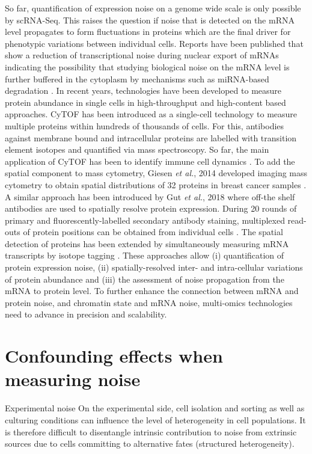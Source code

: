 So far, quantification of expression noise on a genome wide scale is only possible by scRNA-Seq. This raises the question if noise that is detected on the mRNA level propagates to form fluctuations in proteins which are the final driver for phenotypic variations between individual cells. Reports have been published that show a reduction of transcriptional noise during nuclear export of mRNAs \citep{Battich2015a, BaharHalpern2015a} indicating the possibility that studying biological noise on the mRNA level is further buffered in the cytoplasm by mechanisms such as miRNA-based degradation \citep{Schmiedel2015}. In recent years, technologies have been developed to measure protein abundance in single cells in high-throughput and high-content based approaches. \Gls{CyTOF} has been introduced as a single-cell technology to measure multiple proteins within hundreds of thousands of cells. For this, antibodies against membrane bound and intracellular proteins are labelled with transition element isotopes and quantified via mass spectroscopy. So far, the main application of CyTOF has been to identify immune cell dynamics \citep{Bendall2011}. To add the spatial component to mass cytometry, Giesen \emph{et al.}, 2014 developed imaging mass cytometry to obtain spatial distributions of 32 proteins in breast cancer samples \citep{Giesen2014}. A similar approach has been introduced by Gut \emph{et al.}, 2018 where off-the shelf antibodies are used to spatially resolve protein expression. During 20 rounds of primary and fluorescently-labelled secondary antibody staining, multiplexed read-outs of protein positions can be obtained from individual cells \citep{Gut2018}. The spatial detection of proteins has been extended by simultaneously measuring mRNA transcripts by isotope tagging \cite{Schulz2018}. These approaches allow (i) quantification of protein expression noise, (ii) spatially-resolved inter- and intra-cellular variations of protein abundance and (iii) the assessment of noise propagation from the mRNA to protein level. To further enhance the connection between mRNA and protein noise, and chromatin state and mRNA noise, multi-omics technologies need to advance in precision and scalability.

\section{Confounding effects when measuring noise}

Experimental noise
On the experimental side, cell isolation and sorting as well as culturing conditions can influence the level of heterogeneity in cell populations. It is therefore difficult to disentangle intrinsic contribution to noise from extrinsic sources due to cells committing to alternative fates (structured heterogeneity).  \\

